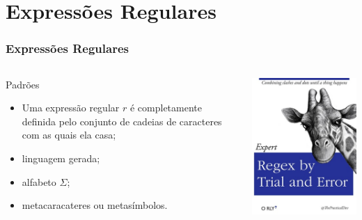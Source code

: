 \documentclass[table]{beamer}
\begin{document}
\section{Expressões Regulares}
\begin{frame}
   \frametitle{Expressões Regulares}
   \begin{columns}
      \begin{column}{0.5\textwidth}
         \begin{block}{Padrões}
            \begin{itemize}
               \item Uma expressão regular $r$ é completamente definida pelo conjunto de cadeias de caracteres com as quais ela casa;
	       \item linguagem gerada;
	       \item alfabeto $\Sigma$;
	       \item metacaracateres ou metasímbolos.
            \end{itemize}
        \end{block}
      \end{column}
      \begin{column}{0.5\textwidth}
         \includegraphics[width=\linewidth,height=\textheight,keepaspectratio]{figuras/trialanderror.jpg}
      \end{column}
   \end{columns}
\end{frame}
\end{document}
